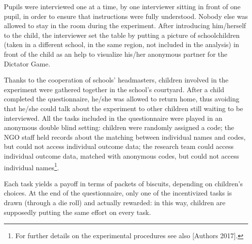 \documentclass[authoryear, preprint, review, 12pt]{elsarticle}
\begin{document}
Pupils were interviewed one at a time, by one interviewer sitting in front of one pupil, in order to ensure that instructions were fully understood. Nobody else was allowed to stay in the room during the experiment. After introducing him/herself to the child, the interviewer set the table by putting a picture of schoolchildren (taken in a different school, in the same region, not included in the analysis) in front of the child as an help to visualize his/her anonymous partner for the Dictator Game.   

Thanks to the cooperation of schools' headmasters, children involved in the experiment were gathered together in the school's courtyard. After a child  completed the questionnaire, he/she was allowed to return home, thus avoiding that he/she could talk about the experiment to other children still waiting to be interviewed.
All the tasks included in the questionnaire were played in an anonymous double blind setting: children were randomly assigned a code; the NGO staff held records about the matching between individual names and codes, but could not access individual outcome data; the research team could access individual outcome data, matched with anonymous codes, but could not access individual names\footnote{For further details on the experimental procedures see also [Authors 2017].}.

Each task yields a payoff in terms of packets of biscuits, depending on children's choices. At the end of the questionnaire, only one of the incentivized tasks is drawn (through a die roll) and actually rewarded: in this way, children are supposedly putting the same effort on every task.
\end{document}
